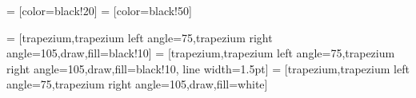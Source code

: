  = [color=black!20]
 = [color=black!50]


%

 = [trapezium,trapezium left angle=75,trapezium right angle=105,draw,fill=black!10]
 = [trapezium,trapezium left angle=75,trapezium right angle=105,draw,fill=black!10, line width=1.5pt]
 = [trapezium,trapezium left angle=75,trapezium right angle=105,draw,fill=white]


%

